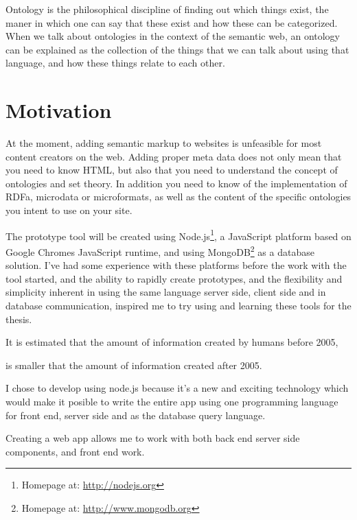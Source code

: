 Ontology is the philosophical discipline of finding out which things exist, 
the maner in which one can say that these exist and how these can be categorized. 
When we talk about ontologies in the context of the semantic web, 
an ontology can be explained as the collection of the things that we can talk about using that language, 
and how these things relate to each other.


\section{Motivation}
At the moment, adding semantic markup to websites is unfeasible for most content creators on the web.
Adding proper meta data does not only mean that you need to know HTML, 
but also that you need to understand the concept of ontologies and set theory. 
In addition you need to know of the implementation of RDFa, microdata or microformats, 
as well as the content of the specific ontologies you intent to use on your site.


The prototype tool will be created using Node.js\footnote{Homepage at: \url{http://nodejs.org}}, 
a JavaScript platform based on Google Chromes JavaScript runtime, 
and using MongoDB\footnote{Homepage at: \url{http://www.mongodb.org}} as a database solution.
I've had some experience with these platforms before the work with the tool started, 
and the ability to rapidly create prototypes, and the flexibility and simplicity inherent in using the same language
server side, client side and in database communication, inspired me to try using and learning these tools for the thesis.

It is estimated that the amount of information created by humans before 2005, 

is smaller that the amount of information created after 2005.

I chose to develop using node.js because it's a new and exciting technology which would make it posible to write the entire app using one programming language for front end, 
server side and as the database query language.

Creating a web app allows me to work with both back end server side components, 
and front end work. 


